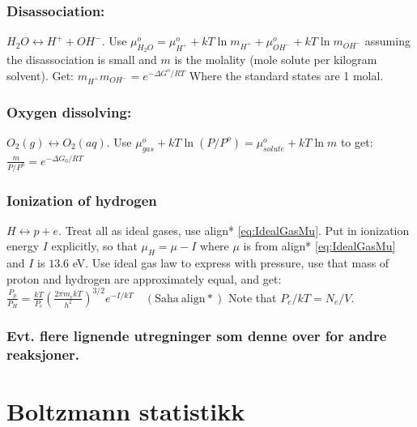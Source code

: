 \documentclass[12pt]{article}
\begin{document}
\subsubsection{Disassociation:}
$H_2O\leftrightarrow H^++OH^-$. Use $\mu^o_{H_2O}=\mu^o_{H^+}+kT\ln m_{H^+}+\mu_{OH^-}^o + kT\ln m_{OH^-}$ assuming the disassociation is small and $m$ is the molality (mole solute per kilogram solvent). Get:
$
m_{H^+}m_{OH^-}=e^{-\Delta G^o/RT}
$
Where the standard states are 1 molal.
\subsubsection{Oxygen dissolving:}
$O_2(g)\leftrightarrow O_2(aq)$.
Use $\mu_{gas}^o+kT\ln(P/P^o)=\mu_{solute}^o+kT\ln m$ to get:
$
\frac{m}{P/P^o}=e^{-\Delta G_0/RT}
$
\subsubsection{Ionization of hydrogen}
$H\leftrightarrow p+e$. Treat all as ideal gases, use align* \ref{eq:IdealGasMu}. Put in ionization energy $I$ explicitly, so that $\mu_H=\mu-I$ where $\mu$ is from align* \ref{eq:IdealGasMu} and $I$ is $13.6$ eV. Use ideal gas law to express with pressure, use that mass of proton and hydrogen are approximately equal, and get:
$
\frac{P_p}{P_H}=\frac{kT}{P_e}\left(\frac{2\pi m_e kT}{h^2}\right)^{3/2} e^{-I/kT} \quad (\mathrm{Saha\ align*})
$
Note that $P_e/kT=N_e/V$.
\subsubsection{Evt. flere lignende utregninger som denne over for andre reaksjoner.}
\section{Boltzmann statistikk}
\end{document}
